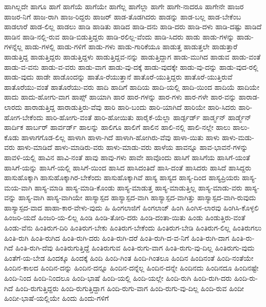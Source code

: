 {ಹಾಗಿಲ್ಲದೇ
ಹಾಗೂ
ಹಾಗೆ
ಹಾಗೆಯೆ
ಹಾಗೆಯೇ
ಹಾಗೆಲ್ಲ
ಹಾಗೆಲ್ಲಾ
ಹಾಗೇ
ಹಾಗೇ-ನಾದರೂ
ಹಾಗೇನೇ
ಹಾಜರ
ಹಾಜರ-ನಿಗೆ
ಹಾಜ-ರಾಗಿ
ಹಾಜ-ರಿದ್ದರು
ಹಾಜರ್
ಹಾಡ-ತೊಡಗಿದರು
ಹಾಡನ್ನು
ಹಾಡ-ಬಲ್ಲ
ಹಾಡ-ಬೇಕೆಂಬ
ಹಾಡಲಾರೆ
ಹಾಡ-ಲಿಲ್ಲ
ಹಾಡಲು
ಹಾಡಿ
ಹಾಡಿತು
ಹಾಡಿದ
ಹಾಡಿ-ದನು
ಹಾಡಿ-ದರು
ಹಾಡಿ-ದಳು
ಹಾಡಿ-ದಷ್ಟು
ಹಾಡಿದೆ
ಹಾಡಿನ
ಹಾಡಿ-ನಲ್ಲಿ-ರುವ
ಹಾಡಿ-ಬಿಡುತ್ತಿದ್ದರು
ಹಾಡಿ-ರಲಿಲ್ಲ-ವೆಂದು
ಹಾಡಿ-ಸಿದರು
ಹಾಡು
ಹಾಡು-ಗಳನ್ನು
ಹಾಡು-ಗಳನ್ನೆಲ್ಲ
ಹಾಡು-ಗಳಲ್ಲಿ
ಹಾಡು-ಗಳಿಗೆ
ಹಾಡು-ಗಳು
ಹಾಡು-ಗಾರಿಕೆಯೂ
ಹಾಡುತ್ತ
ಹಾಡುತ್ತಲೇ
ಹಾಡುತ್ತಾರೆ
ಹಾಡುತ್ತಿದ್ದ
ಹಾಡುತ್ತಿದ್ದರು
ಹಾಡುತ್ತಿದ್ದಳು
ಹಾಡುತ್ತಿದ್ದವ-ನನ್ನು
ಹಾಡುತ್ತಿದ್ದಾಗ
ಹಾಡು-ಮುಗಿದ
ಹಾಡುವ
ಹಾಡು-ವಂತೆ
ಹಾಡು-ವ-ವನು
ಹಾಡು-ವ-ವರು
ಹಾಡು-ವಾಗ
ಹಾಡು-ವು-ದಕ್ಕೆ
ಹಾಡು-ವುದಕ್ಕೇ
ಹಾಡು-ವು-ದನ್ನು
ಹಾಡು-ವುದ-ರಲ್ಲಿ
ಹಾಡು-ವುದು
ಹಾಡೇ
ಹಾಡೊಂದನ್ನು
ಹಾತೊ-ರೆಯುತ್ತಾನೆ
ಹಾತೊರೆ-ಯುತ್ತಿದ್ದರು
ಹಾತೊರೆ-ಯುತ್ತಿರುವೆ
ಹಾತೊರೆಯು-ವಂತೆ
ಹಾತೊರೆಯು-ವರು
ಹಾದಿ
ಹಾದಿಗೆ
ಹಾದಿಯ
ಹಾದಿ-ಯಲ್ಲಿ
ಹಾದಿ-ಯಿಂದ
ಹಾದಿಯೆ
ಹಾದಿಯೇ
ಹಾದು
ಹಾದು-ಹೋಗು-ವಾಗ
ಹಾಪ್ಸ್
ಹಾಯಾಗಿ
ಹಾರ
ಹಾರ-ಗಳನ್ನು
ಹಾರ-ಗಳು
ಹಾರ-ಗಳೇ
ಹಾರ-ವನ್ನು
ಹಾರಾಡ-ಲಾರದು
ಹಾರಾಡುತ್ತಿದ್ದ
ಹಾರಾಡುತ್ತಿರು-ವೆವು
ಹಾರಿ
ಹಾರಿ-ಬಂದು
ಹಾರಿ-ಯಾಗಿದೆ
ಹಾರಿಯೇ
ಹಾರಿ-ಸಿದರು
ಹಾರಿ-ಹೋಗ-ಬೇಕೆಂದು
ಹಾರಿ-ಹೋಗು-ವಂತೆ
ಹಾರಿ-ಹೋಯಿತು
ಹಾರೈಕೆ-ಯೆಲ್ಲಾ
ಹಾರ್ಡ್ಫರ್ಡ್
ಹಾರ್ಡ್ಮನ್
ಹಾರ್ಡ್ಮೆನ್
ಹಾರ್ದಿಕ
ಹಾರ್ಬರ್
ಹಾರ್ವರ್ಡ್
ಹಾಲನ್ನು
ಹಾಲಿಗೂ
ಹಾಲಿಗೆ
ಹಾಲಿನ
ಹಾಲಿ-ನಲ್ಲಿ
ಹಾಲಿ-ನಲ್ಲೇ
ಹಾಲು
ಹಾಲು-ಕೊಡು
ಹಾಳಾಗಗೊಡ-ಲಿಲ್ಲ
ಹಾಳಾಗಿ
ಹಾಳಾ-ಗಿದೆ
ಹಾಳಾಗಿ-ಹೋಗಿರು-ವೆವು
ಹಾಳಾ-ಯಿತು
ಹಾಳು
ಹಾಳು-ಮಡು-ವರು
ಹಾಳು-ಮಾಡಿದೆ
ಹಾಳು-ಮಾಡಿರು-ವರು
ಹಾಳು-ಮಾಡು-ವರು
ಹಾಳೆಯ
ಹಾವನ್ನೂ
ಹಾವ-ಭಾವನೆ-ಗಳನ್ನು
ಹಾವಳಿ-ಯಲ್ಲಿ
ಹಾವಿನ
ಹಾವಿ-ನಂತೆ
ಹಾವು
ಹಾವು-ಗಳು
ಹಾವೇ
ಹಾವೊಂದು
ಹಾಸಿಗೆ
ಹಾಸಿಗೆಯ
ಹಾಸಿಗೆ-ಯಂತೆ
ಹಾಸಿಗೆ-ಯನ್ನು
ಹಾಸಿಗೆ-ಯಲ್ಲಿ
ಹಾಸಿಗೆ-ಯಿಂದ
ಹಾಸಿದ
ಹಾಸಿದಂತಿದೆ
ಹಾಸಿ-ದಂತೆ
ಹಾಸಿದರು
ಹಾಸಿದೆ
ಹಾಸಿದ್ದರು
ಹಾಸುಹೊಕ್ಕಾಗಿ
ಹಾಸುಹೊಕ್ಕಾಗಿರ-ಬೇಕೆಂದು
ಹಾಸುಹೊಕ್ಕಾಗಿವೆ
ಹಾಸ್ಯ
ಹಾಸ್ಯದ
ಹಾಸ್ಯ-ದಿಂದ
ಹಾಸ್ಯಪ್ರಿಯರು
ಹಾಸ್ಯ-ಮಯ-ವಾಗಿ
ಹಾಸ್ಯ-ಮಾಡಿ
ಹಾಸ್ಯ-ಮಾಡಿ-ಕೊಂಡು
ಹಾಸ್ಯ-ಮಾಡುತ್ತ
ಹಾಸ್ಯ-ಮಾಡುತ್ತಿಲ್ಲ
ಹಾಸ್ಯ-ಮಾಡು-ವರು
ಹಾಸ್ಯ-ವನ್ನು
ಹಾಸ್ಯ-ವಾಗಿ
ಹಾಸ್ಯ-ವಾಗಿಯೇ
ಹಾಸ್ಯಾಸ್ಪದ
ಹಾಸ್ಯಾಸ್ಪದ-ವಾಗಿ
ಹಾಸ್ಯಾಸ್ಪದ-ವಾಗಿತ್ತು
ಹಾಸ್ಯಾಸ್ಪದ-ವಾಗಿ-ರುವುದು
ಹಾಸ್ಯಾಸ್ಪದ-ವಾದ
ಹಾಹಾ-ಕಾರ-ವೇಳು-ವುದು
ಹಿ
ಹಿಂಗಲಾಜಿಗೆ
ಹಿಂಗಲಾಜ್
ಹಿಂಗಿ
ಹಿಂಗಿಸ-ಲಾರವು
ಹಿಂಗಿಸಿ-ಕೊಳ್ಳಲಿ
ಹಿಂಜರಿ-ಯದೆ
ಹಿಂಜರಿ-ಯ-ಲಿಲ್ಲ
ಹಿಂಡಿ
ಹಿಂಡಿ-ತೋರಿ-ದರು
ಹಿಂಡಿ-ದಂತಾ-ಯಿತು
ಹಿಂಡು
ಹಿಂಡುತ್ತಿರು-ವಂತೆ
ಹಿಂಡು-ವೆನು
ಹಿಂತಿರುಗ-ದಿರಿ
ಹಿಂತಿರುಗ-ಬೇಕು
ಹಿಂತಿರುಗ-ಬೇಕೆಂದು
ಹಿಂತಿರುಗ-ಬೇಡಿ
ಹಿಂತಿರುಗ-ಲಿಲ್ಲ
ಹಿಂತಿರುಗಲು
ಹಿಂತಿ-ರುಗಿ
ಹಿಂತಿ-ರುಗಿದ
ಹಿಂತಿ-ರುಗಿ-ದರು
ಹಿಂತಿ-ರುಗಿ-ದರೆ
ಹಿಂತಿ-ರುಗಿ-ದ-ವ-ನಿಗೆ
ಹಿಂತಿ-ರುಗಿ-ದಾಗ
ಹಿಂತಿ-ರು-ಗಿದೆ
ಹಿಂತಿ-ರುಗಿ-ದೆವು
ಹಿಂತಿರುಗುತ್ತಿದ್ದೆ
ಹಿಂತಿರುಗುವ
ಹಿಂತಿ-ರುಗು-ವಾಗ
ಹಿಂತಿ-ರುಗು-ವು-ದಿಲ್ಲ
ಹಿಂತಿರುಗು-ವುದು
ಹಿಂತೆಗೆ-ಯ-ಬೇಡ
ಹಿಂದಕ್ಕೂ
ಹಿಂದಕ್ಕೆ
ಹಿಂದಿ
ಹಿಂದಿ-ಗಿಂತ
ಹಿಂದಿ-ಗಿಂತಲೂ
ಹಿಂದಿನ
ಹಿಂದಿನಂತೆ
ಹಿಂದಿ-ನಂತೆಯೇ
ಹಿಂದಿನ-ಕಾಲದ
ಹಿಂದಿನ-ದನ್ನು
ಹಿಂದಿನ-ದನ್ನೂ
ಹಿಂದಿನ-ದನ್ನೆಲ್ಲ
ಹಿಂದಿನ-ದನ್ನೇ
ಹಿಂದಿನದು
ಹಿಂದಿನದೂ
ಹಿಂದಿನಷ್ಟೇ
ಹಿಂದಿ-ನಿಂದ
ಹಿಂದಿ-ನಿಂದಲೂ
ಹಿಂದಿ-ಭಾಷೆ
ಹಿಂದಿ-ಯಲ್ಲಿ
ಹಿಂದಿ-ಯಲ್ಲೇ
ಹಿಂದಿ-ರುಗಿ
ಹಿಂದಿ-ರುಗಿ-ದರು
ಹಿಂದಿ-ರು-ಗಿದೆ
ಹಿಂದಿ-ರುಗುತ್ತಿದ್ದರು
ಹಿಂದಿ-ರುಗುತ್ತಿದ್ದಾಗ
ಹಿಂದಿ-ರುಗು-ವಾಗ
ಹಿಂದಿ-ರುಗು-ವು-ದಿಲ್ಲ
ಹಿಂದಿ-ರುವ
ಹಿಂದೀ
ಹಿಂದೀ-ಭಾಷೆ-ಯಲ್ಲಿಯೇ
ಹಿಂದು
ಹಿಂದು-ಗಳಿಗೆ
}
